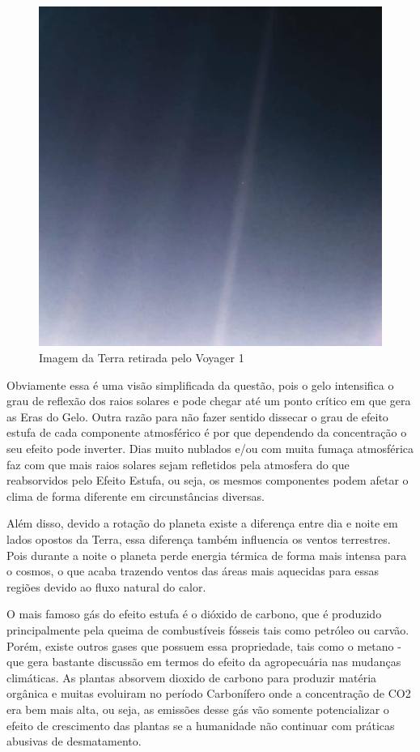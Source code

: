 \begin{figure}[ht]
    \centering
    \includegraphics[scale=0.25]{pictures/pale-blue-dot.jpg}
    \caption{Imagem da Terra retirada pelo Voyager 1}
    \label{blue-dot}
\end{figure}

Obviamente essa é uma visão simplificada da questão, pois o gelo intensifica o grau de reflexão dos raios solares e pode chegar até um ponto crítico em que gera as Eras do Gelo. Outra razão para não fazer sentido dissecar o grau de efeito estufa de cada componente atmosférico é por que dependendo da concentração o seu efeito pode inverter. Dias muito nublados e/ou com muita fumaça atmosférica faz com que mais raios solares sejam refletidos pela atmosfera do que reabsorvidos pelo Efeito Estufa, ou seja, os mesmos componentes podem afetar o clima de forma diferente em circunstâncias diversas.

Além disso, devido a rotação do planeta existe a diferença entre dia e noite em lados opostos da Terra, essa diferença também influencia os ventos terrestres. Pois durante a noite o planeta perde energia térmica de forma mais intensa para o cosmos, o que acaba trazendo ventos das áreas mais aquecidas para essas regiões devido ao fluxo natural do calor.

O mais famoso gás do efeito estufa é o dióxido de carbono, que é produzido principalmente pela queima de combustíveis fósseis tais como petróleo ou carvão. Porém, existe outros gases que possuem essa propriedade, tais como o metano - que gera bastante discussão em termos do efeito da agropecuária nas mudanças climáticas. 
As plantas absorvem dioxido de carbono para produzir matéria orgânica e muitas evoluiram no período Carbonífero onde a concentração de CO2 era bem mais alta, ou seja, as emissões desse gás vão somente potencializar o efeito de crescimento das plantas se a humanidade não continuar com práticas abusivas de desmatamento.

